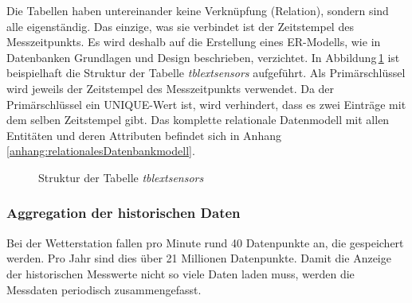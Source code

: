 \noindent
Die Tabellen haben untereinander keine Verknüpfung (Relation), sondern sind alle eigenständig. Das einzige, was sie verbindet ist der Zeitstempel des Messzeitpunkts. Es wird deshalb auf die Erstellung eines ER-Modells, wie in Datenbanken Grundlagen und Design \cite{FrankGeisler2011mitpu} beschrieben, verzichtet. In Abbildung\,\ref{img:tabellenstruktur} ist beispielhaft die Struktur der Tabelle \emph{tblextsensors} aufgeführt. Als Primärschlüssel wird jeweils der Zeitstempel des Messzeitpunkts verwendet. Da der Primärschlüssel ein UNIQUE-Wert ist, wird verhindert, dass es zwei Einträge mit dem selben Zeitstempel gibt. Das komplette relationale Datenmodell mit allen Entitäten und deren Attributen befindet sich in Anhang\,\ref{anhang:relationalesDatenbankmodell}.

\begin{figure}[htbp!]
	\centering
	\caption{Struktur der Tabelle \emph{tblextsensors}}
	\label{img:tabellenstruktur}
\end{figure}



\subsubsection{Aggregation der historischen Daten}
\label{kap:aggregation}
Bei der Wetterstation fallen pro Minute rund 40 Datenpunkte an, die gespeichert werden. Pro Jahr sind dies über 21 Millionen Datenpunkte. Damit die Anzeige der historischen Messwerte nicht so viele Daten laden muss, werden die Messdaten periodisch zusammengefasst.
\newline

